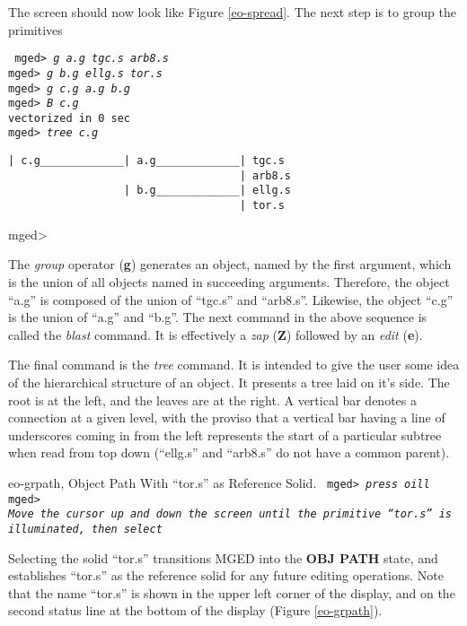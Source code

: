 The screen should now look like Figure \ref{eo-spread}.  The next step
is to group the primitives

\noindent
{\tt
mged> {\em g a.g tgc.s arb8.s}\\
mged> {\em g b.g ellg.s tor.s}\\
mged> {\em g c.g a.g b.g}\\
mged> {\em B c.g}\\
vectorized in 0 sec\\
mged> {\em tree c.g}
\begin{verbatim}
| c.g_____________| a.g_____________| tgc.s
                                    | arb8.s
                  | b.g_____________| ellg.s
                                    | tor.s
\end{verbatim}
\noindent
mged>\\
}

The {\em group} operator ({\bf g}) generates an object, named by the
first argument, which is the union of all objects named in succeeding
arguments.  Therefore, the object ``a.g'' is composed of the union of
``tgc.s'' and ``arb8.s''.  Likewise, the object ``c.g'' is the union of
``a.g'' and ``b.g''.  The next command in the above sequence is called
the {\em blast} command.  It is effectively a {\em zap} ({\bf Z})
followed by an {\em edit} ({\bf e}).

The final command is the {\em tree} command.  It is intended to give the
user some idea of the hierarchical structure of an object.  It presents
a tree laid on it's side.  The root is at the left, and the leaves are
at the right. A vertical bar denotes a connection at a given level, with
the proviso that a vertical bar having a line of underscores coming
in from the left represents the start of a particular subtree when read
from top down (``ellg.s'' and ``arb8.s'' do not have a common parent).

\mfig eo-grpath, Object Path With ``tor.s'' as Reference Solid.
\noindent
{\tt
mged> {\em press oill}\\
mged>\\
{\em Move the cursor up and down the screen until the primitive ``tor.s''
is illuminated, then select}\\
}

Selecting the solid ``tor.s'' transitions MGED into the {\bf OBJ PATH}
state, and establishes ``tor.s'' as the reference solid for any future
editing operations.
Note that the name ``tor.s'' is shown in the upper left corner of the
display, and on the second status line at the bottom of the display
(Figure \ref{eo-grpath}).

